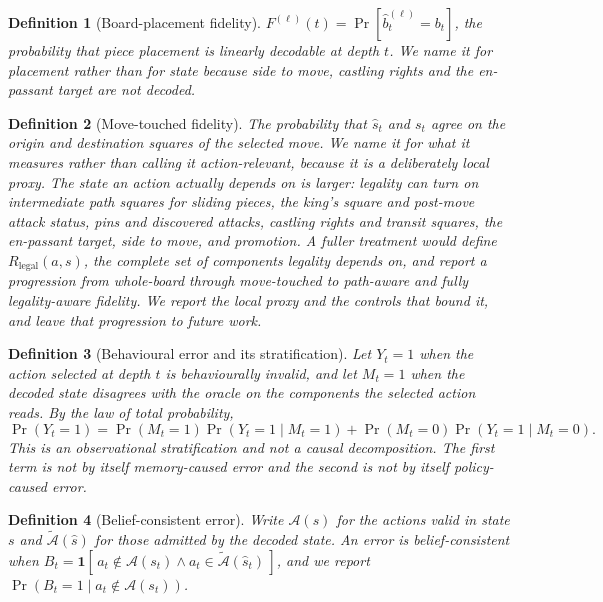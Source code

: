 \documentclass[11pt]{article}
\newtheorem{definition}{Definition}
\theoremstyle{remark}
\begin{document}
\begin{definition}[Board-placement fidelity]
$F^{(\ell)}(t) = \Pr[\hat{b}_t^{(\ell)} = b_t]$, the probability that piece
placement is linearly decodable at depth $t$. We name it for placement rather
than for state because side to move, castling rights and the en-passant target
are not decoded.
\end{definition}

\begin{definition}[Move-touched fidelity]
The probability that $\hat{s}_t$ and $s_t$ agree on the origin and destination
squares of the selected move. We name it for what it measures rather than calling it action-relevant, because
it is a deliberately local proxy. The state an action
actually depends on is larger: legality can turn on intermediate path squares for
sliding pieces, the king's square and post-move attack status, pins and
discovered attacks, castling rights and transit squares, the en-passant target,
side to move, and promotion. A fuller treatment would define
$R_{\mathrm{legal}}(a, s)$, the complete set of components legality depends on,
and report a progression from whole-board through move-touched to path-aware and
fully legality-aware fidelity. We report the local proxy and the controls that
bound it, and leave that progression to future work.
\end{definition}

\begin{definition}[Behavioural error and its stratification]
Let $Y_t = 1$ when the action selected at depth $t$ is behaviourally invalid, and
let $M_t = 1$ when the decoded state disagrees with the oracle on the components
the selected action reads. By the law of total probability,
\[
\Pr(Y_t{=}1) = \Pr(M_t{=}1)\Pr(Y_t{=}1 \mid M_t{=}1)
             + \Pr(M_t{=}0)\Pr(Y_t{=}1 \mid M_t{=}0).
\]
This is an observational stratification and not a causal decomposition. The first
term is not by itself memory-caused error and the second is not by itself
policy-caused error.
\end{definition}

\begin{definition}[Belief-consistent error]
Write $\mathcal{A}(s)$ for the actions valid in state $s$ and
$\widetilde{\mathcal{A}}(\hat{s})$ for those admitted by the decoded state. An
error is \emph{belief-consistent} when
$B_t = \mathbf{1}[\,a_t \notin \mathcal{A}(s_t) \wedge a_t \in
\widetilde{\mathcal{A}}(\hat{s}_t)\,]$, and we report
$\Pr(B_t{=}1 \mid a_t \notin \mathcal{A}(s_t))$.
\end{definition}
\end{document}
